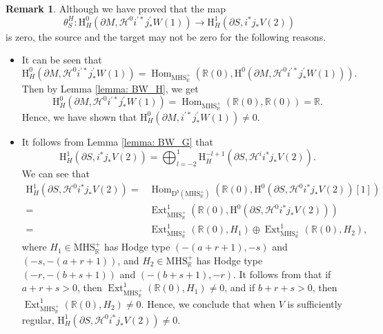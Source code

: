 \documentclass[11pt, a4paper]{amsart}
\theoremstyle{plain}
\theoremstyle{definition}
\newtheorem{remark}[theorem]{Remark}
\numberwithin{equation}{section}
\def\RR{\mathbb{R}}
\DeclareMathOperator{\Hom}{Hom}
\DeclareMathOperator{\Ext}{Ext}
\begin{document}
\begin{remark}
    Although we have proved that the map 
    \begin{equation*}
        \theta^{H}_{S} \colon \mathrm{H}^{0}_{H}(\partial{M}, \mathcal{H}^{0}i^{\prime*}j^{\prime}_{*}W(1)) \rightarrow \mathrm{H}^{1}_{H}(\partial{S}, i^{*}j_{*}V(2)) 
    \end{equation*}
    is zero, the source and the target may not be zero for the following reasons.
    \begin{itemize}
        \item It can be seen that 
            \begin{equation*}
                \mathrm{H}^{0}_{H}(\partial{M}, \mathcal{H}^{0}i^{\prime*}j^{\prime}_{*}W(1)) = \Hom_{\mathrm{MHS}_{\RR}^{+}}(\RR(0), \mathrm{H}^{0}(\partial M, \mathcal{H}^{0}i^{\prime*}j^{\prime}_{*}W(1))). 
            \end{equation*}
            Then by Lemma \ref{lemma: BW_H}, we get
            \begin{equation*}
                \mathrm{H}^{0}_{H}(\partial{M}, \mathcal{H}^{0}i^{\prime*}j^{\prime}_{*}W(1)) = \Hom_{\mathrm{MHS}_{\RR}^{+}}(\RR(0), \RR(0)) = \RR.
            \end{equation*}
            Hence, we have shown that $\mathrm{H}^{0}_{H}(\partial{M}, i^{\prime*}j^{\prime}_{*}W(1)) \neq 0$.  
        \item It follows from Lemma \ref{lemma: BW_G} that 
        \begin{equation*}
              \mathrm{H}^{1}_{H}(\partial{S}, i^{*}j_{*}V(2)) 
             = \bigoplus_{l = - 2}^{1} \mathrm{H}^{-l+1}_{H}(\partial{S}, \mathcal{H}^{i}i^{*}j_{*}V(2)). 
        \end{equation*}
         We can see that 
          \begin{align*}
             \mathrm{H}^{1}_{H}(\partial{S}, \mathcal{H}^{0}i^{*}j_{*}V(2)) = & \Hom_{\mathrm{D}^{b}(\mathrm{MHS}_{\RR}^{+})}(\RR(0), \mathrm{H}^{0}(\partial S, \mathcal{H}^{0}i^{*}j_{*}V(2))[1]) \\
             = & \Ext^{1}_{\mathrm{MHS}_{\RR}^{+}}(\RR(0), \mathrm{H}^{0}(\partial S, \mathcal{H}^{0}i^{*}j_{*}V(2))) \\
             = & \Ext^{1}_{\mathrm{MHS}_{\RR}^{+}}(\RR(0), H_{1}) \oplus \Ext^{1}_{\mathrm{MHS}_{\RR}^{+}}(\RR(0), H_{2}), 
         \end{align*}
         where $H_{1} \in \mathrm{MHS}_{\RR}^{+}$ has Hodge type $(-(a + r + 1), -s)$ and $(-s, -(a + r + 1))$, and $H_{2} \in \mathrm{MHS}_{\RR}^{+}$ has Hodge type $(-r, -(b + s + 1))$ and $(-(b + s + 1), -r)$. 
         It follows from \cite[Theorem A.2.10.]{HW98} that if $a + r + s > 0$, then $\Ext^{1}_{\mathrm{MHS}_{\RR}^{+}}(\RR(0), H_{1}) \neq 0$, 
         and if $b + r + s > 0$, then $\Ext^{1}_{\mathrm{MHS}_{\RR}^{+}}(\RR(0), H_{2}) \neq 0$.
         Hence, we conclude that when $V$ is sufficiently regular, $\mathrm{H}^{1}_{H}(\partial{S}, \mathcal{H}^{0}i^{*}j_{*}V(2)) \neq 0$.
    \end{itemize}
\end{remark}
\end{document}
